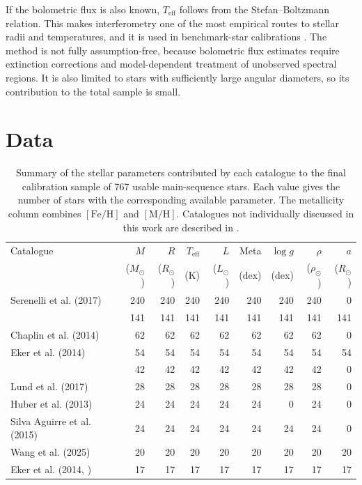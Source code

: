 If the bolometric flux is also known, $T_{\mathrm{eff}}$ follows from the Stefan--Boltzmann relation. This makes interferometry one of the most empirical routes to stellar radii and temperatures, and it is used in benchmark-star calibrations \citep{Soubiran2024}. The method is not fully assumption-free, because bolometric flux estimates require extinction corrections and model-dependent treatment of unobserved spectral regions. It is also limited to stars with sufficiently large angular diameters, so its contribution to the total sample is small.


\section{Data} \label{sec:data}
\begin{table}[H]
\centering
\setlength{\tabcolsep}{4pt}
\caption{Summary of the stellar parameters contributed by each catalogue to the final calibration sample of 767 usable main-sequence stars. Each value gives the number of stars with the corresponding available parameter. The metallicity column combines $[\mathrm{Fe}/\mathrm{H}]$ and $[\mathrm{M}/\mathrm{H}]$. Catalogues not individually discussed in this work are described in \citet{moya2018}.}
\footnotesize
\begin{tabular}{lrrrrrrrr}
\hline\hline
Catalogue & $M$ & $R$ & $T_{\mathrm{eff}}$ & $L$ & Meta & $\log g$ & $\rho$ & $a$\\
~ & ($M_\odot$) & ($R_\odot$) & (K) & ($L_\odot$) & (dex) & (dex) & ($\rho_\odot$) & ($R_\odot$)\\
\hline
Serenelli et al. (2017) & 240 & 240 & 240 & 240 & 240 & 240 & 240 & 0\\
\citet{Xiong2023} & 141 & 141 & 141 & 141 & 141 & 141 & 141 & 141\\
Chaplin et al. (2014) & 62 & 62 & 62 & 62 & 62 & 62 & 62 & 0\\
Eker et al. (2014) & 54 & 54 & 54 & 54 & 54 & 54 & 54 & 54\\
\citet{Yildiz2019} & 42 & 42 & 42 & 42 & 42 & 42 & 42 & 0\\
Lund et al. (2017) & 28 & 28 & 28 & 28 & 28 & 28 & 28 & 0\\
Huber et al. (2013) & 24 & 24 & 24 & 24 & 24 & 0 & 24 & 0\\
Silva Aguirre et al. (2015) & 24 & 24 & 24 & 24 & 24 & 24 & 24 & 0\\
Wang et al. (2025) & 20 & 20 & 20 & 20 & 20 & 20 & 20 & 20\\
Eker et al. (2014, \citeyear{Eker2018}) & 17 & 17 & 17 & 17 & 17 & 17 & 17 & 17\\

\end{tabular}
\end{table}
